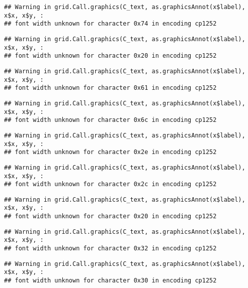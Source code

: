 \documentclass[
]{article}
\begin{document}
\begin{verbatim}
## Warning in grid.Call.graphics(C_text, as.graphicsAnnot(x$label), x$x, x$y, :
## font width unknown for character 0x74 in encoding cp1252
\end{verbatim}

\begin{verbatim}
## Warning in grid.Call.graphics(C_text, as.graphicsAnnot(x$label), x$x, x$y, :
## font width unknown for character 0x20 in encoding cp1252
\end{verbatim}

\begin{verbatim}
## Warning in grid.Call.graphics(C_text, as.graphicsAnnot(x$label), x$x, x$y, :
## font width unknown for character 0x61 in encoding cp1252
\end{verbatim}

\begin{verbatim}
## Warning in grid.Call.graphics(C_text, as.graphicsAnnot(x$label), x$x, x$y, :
## font width unknown for character 0x6c in encoding cp1252
\end{verbatim}

\begin{verbatim}
## Warning in grid.Call.graphics(C_text, as.graphicsAnnot(x$label), x$x, x$y, :
## font width unknown for character 0x2e in encoding cp1252
\end{verbatim}

\begin{verbatim}
## Warning in grid.Call.graphics(C_text, as.graphicsAnnot(x$label), x$x, x$y, :
## font width unknown for character 0x2c in encoding cp1252
\end{verbatim}

\begin{verbatim}
## Warning in grid.Call.graphics(C_text, as.graphicsAnnot(x$label), x$x, x$y, :
## font width unknown for character 0x20 in encoding cp1252
\end{verbatim}

\begin{verbatim}
## Warning in grid.Call.graphics(C_text, as.graphicsAnnot(x$label), x$x, x$y, :
## font width unknown for character 0x32 in encoding cp1252
\end{verbatim}

\begin{verbatim}
## Warning in grid.Call.graphics(C_text, as.graphicsAnnot(x$label), x$x, x$y, :
## font width unknown for character 0x30 in encoding cp1252
\end{verbatim}
\end{document}
